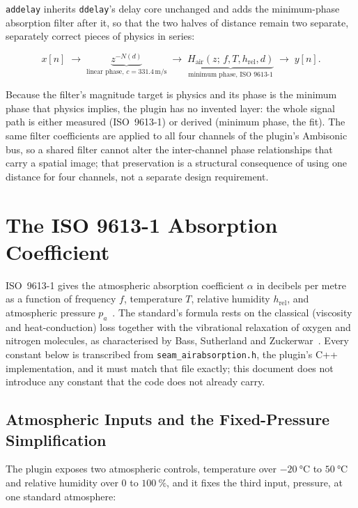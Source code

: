 \documentclass[11pt,a4paper]{article}
\begin{document}
\texttt{addelay} inherits \texttt{ddelay}'s delay core unchanged and adds the minimum-phase absorption filter after it, so that the two halves of distance remain two separate, separately correct pieces of physics in series:

\begin{equation}
x[n] \;\longrightarrow\; \underbrace{z^{-N(d)}}_{\text{linear phase, }c=331.4\,\text{m/s}} \;\longrightarrow\; \underbrace{H_\text{air}(z;\,f,T,h_\text{rel},d)}_{\text{minimum phase, ISO 9613-1}} \;\longrightarrow\; y[n] .
\end{equation}

Because the filter's magnitude target is physics and its phase is the minimum phase that physics implies, the plugin has no invented layer: the whole signal path is either measured (ISO~9613-1) or derived (minimum phase, the fit).
The same filter coefficients are applied to all four channels of the plugin's Ambisonic bus, so a shared filter cannot alter the inter-channel phase relationships that carry a spatial image; that preservation is a structural consequence of using one distance for four channels, not a separate design requirement.

\section{The ISO 9613-1 Absorption Coefficient}
\label{sec:iso}

ISO~9613-1 gives the atmospheric absorption coefficient $\alpha$ in decibels per metre as a function of frequency $f$, temperature $T$, relative humidity $h_\text{rel}$, and atmospheric pressure $p_a$~\cite{ISO9613-1993}.
The standard's formula rests on the classical (viscosity and heat-conduction) loss together with the vibrational relaxation of oxygen and nitrogen molecules, as characterised by Bass, Sutherland and Zuckerwar~\cite{BassSutherlandZuckerwar1990,BassEtAl1995}.
Every constant below is transcribed from \texttt{seam\_airabsorption.h}, the plugin's C++ implementation, and it must match that file exactly; this document does not introduce any constant that the code does not already carry.

\subsection{Atmospheric Inputs and the Fixed-Pressure Simplification}

The plugin exposes two atmospheric controls, temperature over $\SI{-20}{\celsius}$ to $\SI{50}{\celsius}$ and relative humidity over $0$ to $\SI{100}{\percent}$, and it fixes the third input, pressure, at one standard atmosphere:
\end{document}

